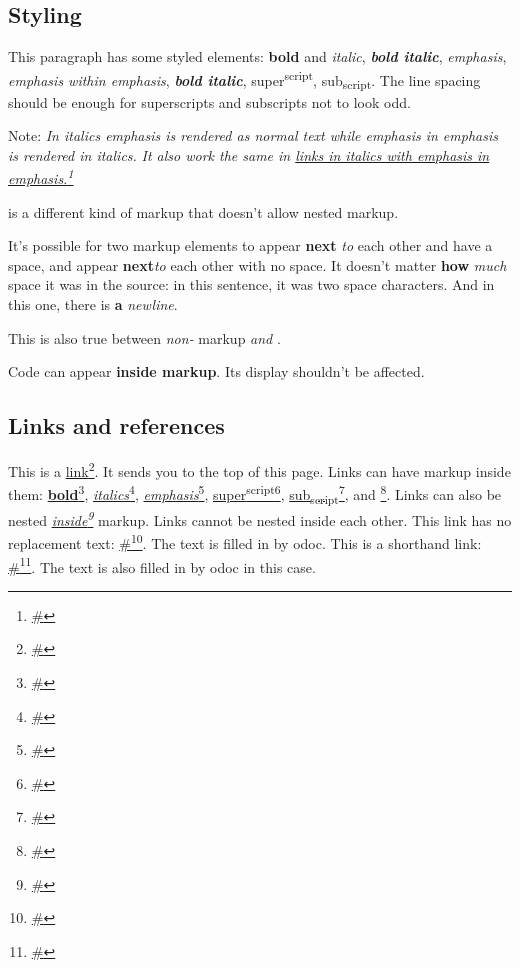 \subsection{Styling\label{styling}}%
This paragraph has some styled elements: \textbf{bold} and \emph{italic}, \textbf{\emph{bold italic}}, \emph{emphasis}, \emph{\emph{emphasis} within emphasis}, \textbf{\emph{bold italic}}, super\textsuperscript{script}, sub\textsubscript{script}. The line spacing should be enough for superscripts and subscripts not to look odd.

Note: \emph{In italics \emph{emphasis} is rendered as normal text while \emph{emphasis \emph{in} emphasis} is rendered in italics.} \emph{It also work the same in \href{\#}{links in italics with \emph{emphasis \emph{in} emphasis}.}\footnote{\url{\#}}}

 is a different kind of markup that doesn't allow nested markup.

It's possible for two markup elements to appear \textbf{next} \emph{to} each other and have a space, and appear \textbf{next}\emph{to} each other with no space. It doesn't matter \textbf{how} \emph{much} space it was in the source: in this sentence, it was two space characters. And in this one, there is \textbf{a} \emph{newline}.

This is also true between \emph{non-} markup \emph{and} .

Code can appear \textbf{inside  markup}. Its display shouldn't be affected.

\subsection{Links and references\label{links-and-references}}%
This is a \href{\#}{link}\footnote{\url{\#}}. It sends you to the top of this page. Links can have markup inside them: \href{\#}{\textbf{bold}}\footnote{\url{\#}}, \href{\#}{\emph{italics}}\footnote{\url{\#}}, \href{\#}{\emph{emphasis}}\footnote{\url{\#}}, \href{\#}{super\textsuperscript{script}}\footnote{\url{\#}}, \href{\#}{sub\textsubscript{script}}\footnote{\url{\#}}, and \href{\#}{}\footnote{\url{\#}}. Links can also be nested \emph{\href{\#}{inside}\footnote{\url{\#}}} markup. Links cannot be nested inside each other. This link has no replacement text: \href{\#}{\#}\footnote{\url{\#}}. The text is filled in by odoc. This is a shorthand link: \href{\#}{\#}\footnote{\url{\#}}. The text is also filled in by odoc in this case.

